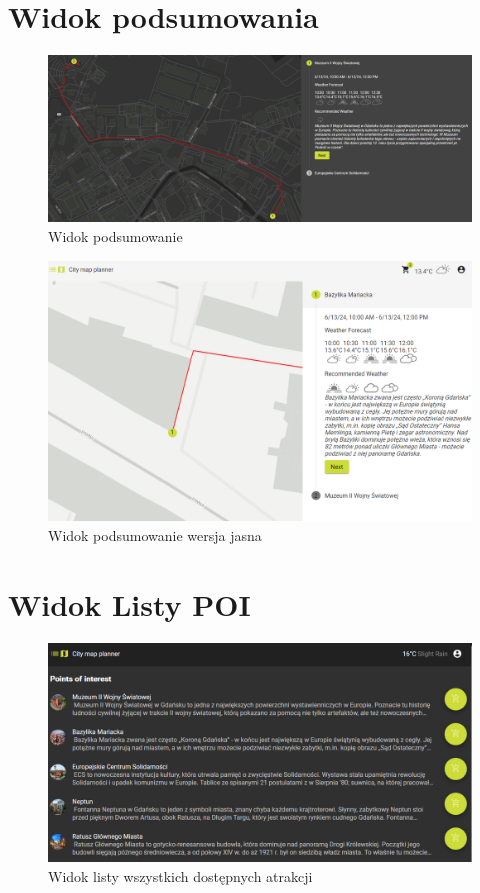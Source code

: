 \section{Widok podsumowania}
\label{sec:atrakcjawidok}
\begin{figure}[H]
    \centering
    \includegraphics[width=1\textwidth]{attachments/podsumowanie}
    \caption{Widok podsumowanie}
    \label{fig:podsumowanie}
\end{figure}
\begin{figure}[H]
    \centering
    \includegraphics[width=1\textwidth]{attachments/podsumowanie-light}
    \caption{Widok podsumowanie wersja jasna}
    \label{fig:podsumowanie-light}
\end{figure}
\section{Widok Listy POI}
\label{sec:poilist}

\begin{figure}[H]
    \centering
    \includegraphics[width=1\textwidth]{attachments/poilist}
    \caption{Widok listy wszystkich dostępnych atrakcji}
    \label{fig:poilist}
\end{figure}


